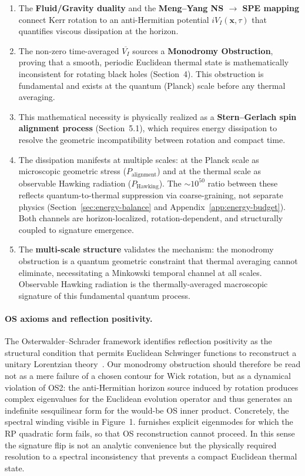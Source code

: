 \documentclass[11pt]{article}
\begin{document}
\begin{enumerate}
\item The \textbf{Fluid/Gravity duality} and the \textbf{Meng--Yang NS $\to$ SPE 
mapping} connect Kerr rotation to an anti-Hermitian potential $iV_I(\mathbf{x}, \tau)$ 
that quantifies viscous dissipation at the horizon.

\item The non-zero time-averaged $\overline{V_I}$ sources a \textbf{Monodromy 
Obstruction}, proving that a smooth, periodic Euclidean thermal state is 
mathematically inconsistent for rotating black holes (Section~4). This obstruction 
is fundamental and exists at the quantum (Planck) scale before any thermal averaging.

\item This mathematical necessity is physically realized as a \textbf{Stern--Gerlach 
spin alignment process} (Section~5.1), which requires energy dissipation to resolve 
the geometric incompatibility between rotation and compact time.

\item The dissipation manifests at multiple scales: at the Planck scale as microscopic 
geometric stress ($P_{\text{alignment}}$) and at the thermal scale as observable 
Hawking radiation ($P_{\text{Hawking}}$). The $\sim 10^{50}$ ratio between these 
reflects quantum-to-thermal suppression via coarse-graining, not separate physics 
(Section~\ref{sec:energy-balance} and Appendix~\ref{app:energy-budget}). Both channels 
are horizon-localized, rotation-dependent, and structurally coupled to signature 
emergence.

\item The \textbf{multi-scale structure} validates the mechanism: the monodromy 
obstruction is a quantum geometric constraint that thermal averaging cannot eliminate, 
necessitating a Minkowski temporal channel at all scales. Observable Hawking radiation 
is the thermally-averaged macroscopic signature of this fundamental quantum process.
\end{enumerate}

\paragraph{OS axioms and reflection positivity.}
The Osterwalder--Schrader framework identifies reflection positivity as the structural condition that permits Euclidean Schwinger functions to reconstruct a unitary Lorentzian theory~\cite{NeebOlafsson2018}.  Our monodromy obstruction should therefore be read not as a mere failure of a chosen contour for Wick rotation, but as a dynamical violation of OS2: the anti-Hermitian horizon source induced by rotation produces complex eigenvalues for the Euclidean evolution operator and thus generates an indefinite sesquilinear form for the would-be OS inner product.  Concretely, the spectral winding visible in Figure~1. furnishes explicit eigenmodes for which the RP quadratic form fails, so that OS reconstruction cannot proceed.  In this sense the signature flip is not an analytic convenience but the physically required resolution to a spectral inconsistency that prevents a compact Euclidean thermal state.
\end{document}
